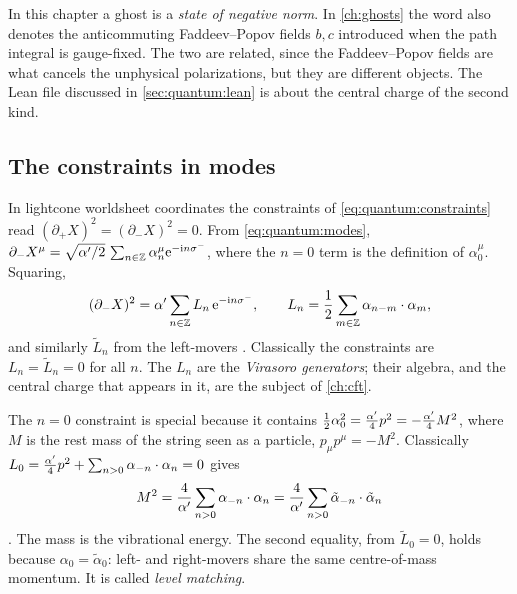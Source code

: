 \begin{pitfallbox}
In this chapter a ghost is a \emph{state of negative norm}. In \cref{ch:ghosts} the word
also denotes the anticommuting Faddeev--Popov fields $b,c$ introduced when the path integral
is gauge-fixed. The two are related, since the Faddeev--Popov fields are what cancels the
unphysical polarizations, but they are different objects. The Lean file discussed in
\cref{sec:quantum:lean} is about the central charge of the second kind.
\end{pitfallbox}

\subsection{The constraints in modes}

In lightcone worldsheet coordinates the constraints of \cref{eq:quantum:constraints} read
$(\partial_+X)^2=(\partial_-X)^2=0$. From \cref{eq:quantum:modes},
$\partial_-X^\mu=\sqrt{\alpha'/2}\,\sum_{n\in\mathbb{Z}}\alpha^\mu_n\mathrm{e}^{-\mathrm{i} n\sigma^-}$, where the $n=0$
term is the definition of $\alpha_0^\mu$. Squaring,
\begin{equation}\label{eq:quantum:Ln}
 (\partial_-X)^2=\alpha'\sum_{n\in\mathbb{Z}}L_n\,\mathrm{e}^{-\mathrm{i} n\sigma^-},\qquad
 L_n=\frac12\sum_{m\in\mathbb{Z}}\alpha_{n-m}\cdot\alpha_m ,
\end{equation}
and similarly $\tilde L_n$ from the left-movers .
Classically the constraints are $L_n=\tilde L_n=0$ for all $n$. The $L_n$ are the
\emph{Virasoro generators}; their algebra, and the central charge
that appears in it, are the subject of \cref{ch:cft}.

The $n=0$ constraint is special because it contains
$\frac12\alpha_0^2=\frac{\alpha'}{4}p^2=-\frac{\alpha'}{4}M^2$, where $M$ is the rest mass of the
string seen as a particle, $p_\mu p^\mu=-M^2$. Classically
$L_0=\frac{\alpha'}{4}p^2+\sum_{n>0}\alpha_{-n}\cdot\alpha_n=0$ gives
\begin{equation}\label{eq:quantum:classmass}
 M^2=\frac4{\alpha'}\sum_{n>0}\alpha_{-n}\cdot\alpha_n
    =\frac4{\alpha'}\sum_{n>0}\tilde\alpha_{-n}\cdot\tilde\alpha_n
\end{equation}
. The mass is the vibrational energy. The second equality,
from $\tilde L_0=0$, holds because $\alpha_0=\tilde\alpha_0$: left- and right-movers share the
same centre-of-mass momentum. It is called \emph{level matching}.


